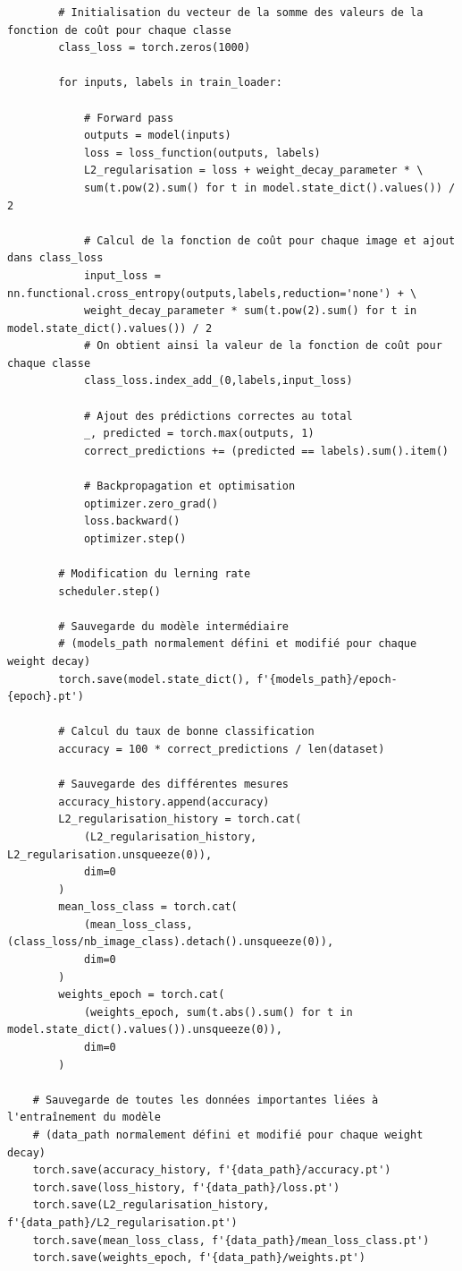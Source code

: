 \documentclass[12pt,english, openany]{book}
\begin{document}
\begin{verbatim}
        # Initialisation du vecteur de la somme des valeurs de la fonction de coût pour chaque classe
        class_loss = torch.zeros(1000)
        
        for inputs, labels in train_loader:
        
            # Forward pass 
            outputs = model(inputs) 
            loss = loss_function(outputs, labels)
            L2_regularisation = loss + weight_decay_parameter * \ 
            sum(t.pow(2).sum() for t in model.state_dict().values()) / 2
    
            # Calcul de la fonction de coût pour chaque image et ajout dans class_loss
            input_loss = nn.functional.cross_entropy(outputs,labels,reduction='none') + \
            weight_decay_parameter * sum(t.pow(2).sum() for t in model.state_dict().values()) / 2
            # On obtient ainsi la valeur de la fonction de coût pour chaque classe
            class_loss.index_add_(0,labels,input_loss)
            
            # Ajout des prédictions correctes au total
            _, predicted = torch.max(outputs, 1)
            correct_predictions += (predicted == labels).sum().item()
    
            # Backpropagation et optimisation 
            optimizer.zero_grad() 
            loss.backward() 
            optimizer.step()
        
        # Modification du lerning rate
        scheduler.step()
    
        # Sauvegarde du modèle intermédiaire 
        # (models_path normalement défini et modifié pour chaque weight decay) 
        torch.save(model.state_dict(), f'{models_path}/epoch-{epoch}.pt')
    
        # Calcul du taux de bonne classification
        accuracy = 100 * correct_predictions / len(dataset)
    
        # Sauvegarde des différentes mesures
        accuracy_history.append(accuracy)
        L2_regularisation_history = torch.cat(
            (L2_regularisation_history, L2_regularisation.unsqueeze(0)), 
            dim=0
        )
        mean_loss_class = torch.cat(
            (mean_loss_class,(class_loss/nb_image_class).detach().unsqueeze(0)), 
            dim=0
        )
        weights_epoch = torch.cat(
            (weights_epoch, sum(t.abs().sum() for t in model.state_dict().values()).unsqueeze(0)), 
            dim=0
        )
            
    # Sauvegarde de toutes les données importantes liées à l'entraînement du modèle
    # (data_path normalement défini et modifié pour chaque weight decay)
    torch.save(accuracy_history, f'{data_path}/accuracy.pt')
    torch.save(loss_history, f'{data_path}/loss.pt')
    torch.save(L2_regularisation_history, f'{data_path}/L2_regularisation.pt')
    torch.save(mean_loss_class, f'{data_path}/mean_loss_class.pt')
    torch.save(weights_epoch, f'{data_path}/weights.pt')

\end{verbatim}
\end{document}
